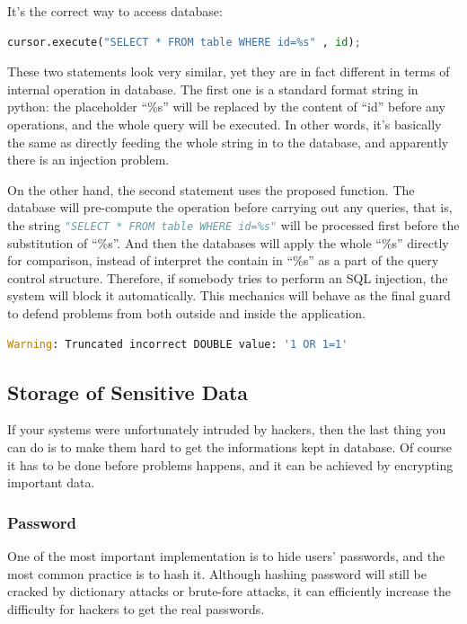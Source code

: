 \documentclass[conference]{IEEEtran}
\begin{document}
It's the correct way to access database:
\begin{lstlisting}[language=python]
cursor.execute("SELECT * FROM table WHERE id=%s" , id);
\end{lstlisting}

These two statements look very similar, yet they are
in fact different in terms of internal operation in database.
The first one is a standard format string in python:
the placeholder ``\%s'' will be replaced by the content
of ``id'' before any operations,
and the whole query will be executed.
In other words, it's basically the same as directly
feeding the whole string in to the database,
and
apparently there is an injection problem.

On the other hand,
the second statement uses the proposed function.
The database will pre-compute the operation before carrying out any queries,
that is, the string \lstinline[language=python]{"SELECT * FROM table WHERE id=%s"}
will be processed first before the substitution of ``\%s''.
And then the databases will apply the whole ``\%s'' directly for comparison,
instead of interpret the contain in ``\%s'' as a part of the
query control structure.
Therefore,
if somebody tries to perform an SQL injection, the system will block it automatically.
This mechanics will behave as the final guard to defend problems
from both outside and inside
the application.
\begin{lstlisting}[language=python]
Warning: Truncated incorrect DOUBLE value: '1 OR 1=1'
\end{lstlisting}

\subsection{Storage of Sensitive Data}
If your systems were unfortunately intruded by hackers,
then the last thing you can do is to make them hard to get the informations
kept in database.
Of course it has to be done before problems happens,
and it can be achieved by
encrypting important data.

\subsubsection{Password}
One of the most important implementation is to hide
users' passwords, and the most common practice is to hash it.
Although hashing password will still be cracked by
dictionary attacks or brute-fore attacks,
it can efficiently increase the difficulty for hackers to
get the real passwords.
\end{document}
